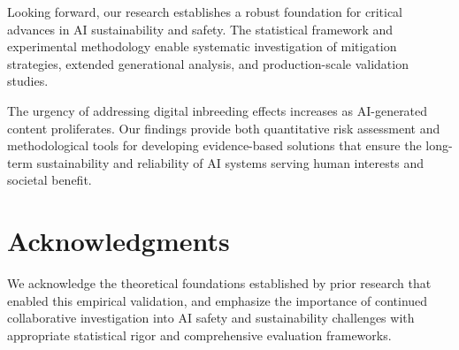 \documentclass[11pt]{article}
\begin{document}
Looking forward, our research establishes a robust foundation for critical advances in AI sustainability and safety. The statistical framework and experimental methodology enable systematic investigation of mitigation strategies, extended generational analysis, and production-scale validation studies.

The urgency of addressing digital inbreeding effects increases as AI-generated content proliferates. Our findings provide both quantitative risk assessment and methodological tools for developing evidence-based solutions that ensure the long-term sustainability and reliability of AI systems serving human interests and societal benefit.

\section*{Acknowledgments}

We acknowledge the theoretical foundations established by prior research that enabled this empirical validation, and emphasize the importance of continued collaborative investigation into AI safety and sustainability challenges with appropriate statistical rigor and comprehensive evaluation frameworks.



\end{document}
